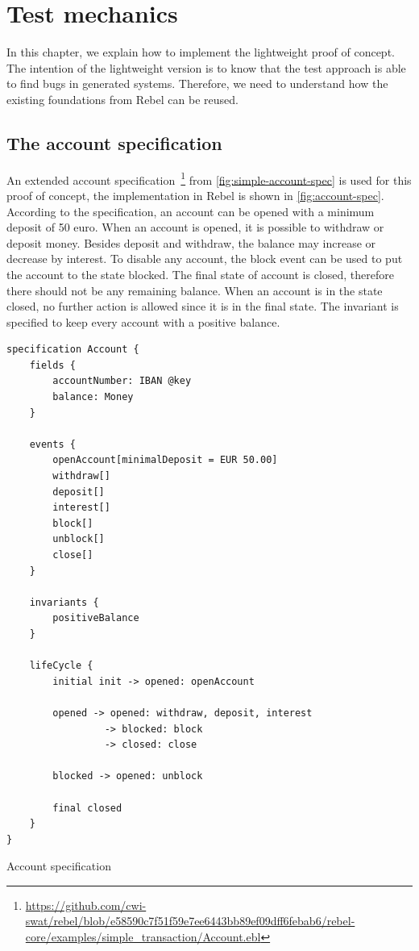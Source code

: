\chapter{Test mechanics}\label{sec:ch3}

In this chapter, we explain how to implement the lightweight proof of concept. The intention of the lightweight version is to know that the test approach is able to find bugs in generated systems. Therefore, we need to understand how the existing foundations from Rebel can be reused.


\section{The account specification}
An extended account specification~\footnote{\url{https://github.com/cwi-swat/rebel/blob/e58590c7f51f59e7ee6443bb89ef09dff6febab6/rebel-core/examples/simple_transaction/Account.ebl}} from \autoref{fig:simple-account-spec} is used for this proof of concept, the implementation in Rebel is shown in \autoref{fig:account-spec}. According to the specification, an account can be opened with a minimum deposit of 50 euro. When an account is opened, it is possible to withdraw or deposit money. Besides deposit and withdraw, the balance may increase or decrease by interest. To disable any account, the block event can be used to put the account to the state blocked. The final state of account is closed, therefore there should not be any remaining balance. When an account is in the state closed, no further action is allowed since it is in the final state. The invariant is specified to keep every account with a positive balance.


\begin{sourcecode}[h!]
\begin{lstlisting}[]
specification Account {
	fields {
		accountNumber: IBAN @key
		balance: Money
	}

	events {
		openAccount[minimalDeposit = EUR 50.00]
		withdraw[]
		deposit[]
		interest[]
		block[]
		unblock[]
		close[]
	}

	invariants {
		positiveBalance
	}

	lifeCycle {
		initial init -> opened: openAccount

		opened -> opened: withdraw, deposit, interest
			     -> blocked: block
			     -> closed: close

		blocked -> opened: unblock

		final closed
	}
}
\end{lstlisting}
\caption{Account specification}\label{fig:account-spec}
\end{sourcecode}
\FloatBarrier

